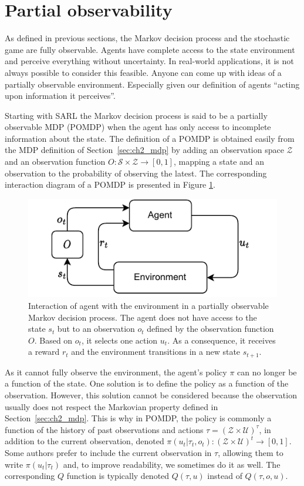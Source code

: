 \section{Partial observability} \label{sec:ch2_partial_observability}
As defined in previous sections, the Markov decision process and the stochastic game are fully observable.
Agents have complete access to the state environment and perceive everything without uncertainty.
In real-world applications, it is not always possible to consider this feasible.
Anyone can come up with ideas of a partially observable environment.
Especially given our definition of agents ``acting upon information it perceives''.

Starting with SARL the Markov decision process is said to be a partially observable MDP (POMDP) \citep{KAELBLING199899} when the agent has only access to incomplete information about the state.
The definition of a POMDP is obtained easily from the MDP definition of Section~\ref{sec:ch2_mdp} by adding an observation space $\mathcal{Z}$ and an observation function $O:\mathcal{S} \times \mathcal{Z} \rightarrow [0, 1]$, mapping a state and an observation to the probability of observing the latest.
The corresponding interaction diagram of a POMDP is presented in Figure \ref{fig:ch2_pomdp}.

\begin{figure}
    \centering
    \includegraphics[width=.8\linewidth]{tex_thesis/figures/ch2/POMDP.pdf}
    \caption{Interaction of agent with the environment in a partially observable Markov decision process\citep{KAELBLING199899}. The agent does not have access to the state $s_t$ but to an observation $o_t$ defined by the observation function $O$. Based on $o_t$, it selects one action $u_t$. As a consequence, it receives a reward $r_t$ and the environment transitions in a new state $s_{t+1}$.}
    \label{fig:ch2_pomdp}
\end{figure}

As it cannot fully observe the environment, the agent's policy $\pi$ can no longer be a function of the state.
One solution is to define the policy as a function of the observation.
However, this solution cannot be considered because the observation usually does not respect the Markovian property defined in Section~\ref{sec:ch2_mdp}.
This is why in POMDP, the policy is commonly a function of the history of past observations and actions $\tau=(\mathcal{Z} \times \mathcal{U})^\tau$, in addition to the current observation, denoted $\pi(u_t|\tau_t,o_t): (\mathcal{Z} \times \mathcal{U})^t \rightarrow [0,1]$.
Some authors prefer to include the current observation in $\tau$, allowing them to write $\pi(u_t|\tau_t)$ and, to improve readability, we sometimes do it as well.
The corresponding $Q$ function is typically denoted $Q(\tau,u)$ instead of $Q(\tau, o, u)$.

